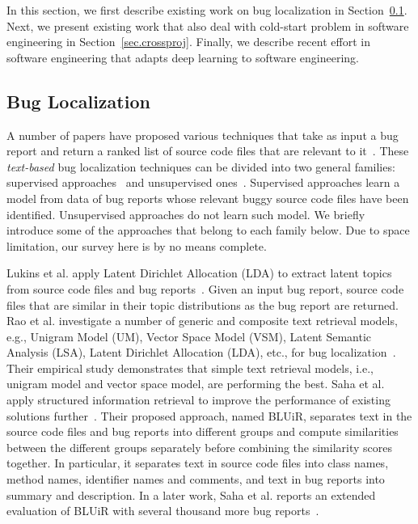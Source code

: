 In this section, we first describe existing work on bug localization in Section~\ref{sec.bugloc}. Next, we present existing work that also deal with cold-start problem in software engineering in Section~\ref{sec.crossproj}. Finally, we describe recent effort in software engineering that adapts deep learning to software engineering.

\subsection{Bug Localization}\label{sec.bugloc}


A number of papers have proposed various techniques that take as input a bug report and return a ranked list of source code files that are relevant to it~\cite{lukins2008source,rao2011retrieval,rao2013incremental,SahaLKP13,SahaLKP14,zhou2012should,huo2016learning}. These {\em text-based} bug localization techniques can be divided into two general families: supervised approaches~\cite{zhou2012should,huo2016learning} and unsupervised ones~\cite{lukins2008source,rao2011retrieval,rao2013incremental,SahaLKP13,SahaLKP14}. Supervised approaches learn a model from data of bug reports whose relevant buggy source code files have been identified. Unsupervised approaches do not learn such model. We briefly introduce some of the approaches that belong to each family below. Due to space limitation, our survey here is by no means complete.

\vspace{0.2cm} Lukins et al. apply Latent Dirichlet Allocation (LDA) to extract latent topics from source code files and bug reports~\cite{lukins2008source}. Given an input bug report, source code files that are similar in their topic distributions as the bug report are returned. Rao et al. investigate a number of generic and composite text retrieval models, e.g., Unigram Model (UM), Vector Space Model (VSM), Latent Semantic Analysis (LSA), Latent Dirichlet Allocation (LDA), etc., for bug localization~\cite{rao2011retrieval}. Their empirical study demonstrates that simple text retrieval models, i.e., unigram model and vector space model, are performing the best. Saha et al. apply structured information retrieval to improve the performance of existing solutions further~\cite{SahaLKP13}. Their proposed approach, named BLUiR, separates text in the source code files and bug reports into different groups and compute similarities between the different groups separately before combining the similarity scores together. In particular, it separates text in source code files into class names, method names, identifier names and comments, and text in bug reports into summary and description. In a later work, Saha et al.  reports an extended evaluation of BLUiR with several thousand more bug reports~\cite{SahaLKP14}.

